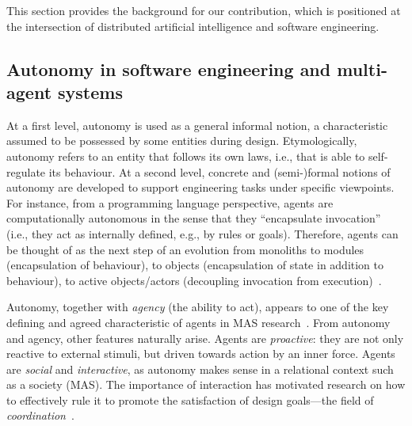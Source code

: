 This section provides the background for our contribution, 
 which is positioned at the intersection 
 of distributed artificial intelligence 
 and software engineering.

\subsection{Autonomy in software engineering and multi-agent systems}
\label{background-autonomy}

At a first level, autonomy is used as a general informal notion, a characteristic 
 assumed to be possessed by some entities during design.
%
Etymologically, autonomy refers to an entity that follows its own laws, i.e., that is able to self-regulate its behaviour.
%
At a second level, concrete and (semi-)formal notions of autonomy are developed to support engineering tasks under specific viewpoints.
%
For instance, from a programming language perspective, 
 agents are computationally autonomous in the sense that they ``encapsulate invocation'' (i.e., they act as internally defined, e.g., by rules or goals). Therefore, agents can be thought of as the next step of an evolution from monoliths to modules (encapsulation of behaviour), to objects
(encapsulation of state in addition to behaviour), to active objects/actors
(decoupling invocation from execution)~\cite{odell2002-objects-and-agents}.

Autonomy, together with \emph{agency} (the ability to act), appears to one of the key defining and agreed characteristic of agents in MAS research~\cite{franklin1996agent}.
%
From autonomy and agency, other features naturally arise.
%
Agents are \emph{proactive}: they are not only reactive to external stimuli, 
 but driven towards action by an inner force.
%
Agents are \emph{social} and \emph{interactive},
 as autonomy makes sense in a relational context such as a society (MAS).
%
The importance of interaction has motivated research 
 on how to effectively rule it to promote 
 the satisfaction of design goals---the field of \emph{coordination}~\cite{malone1994interdisciplinary}.

